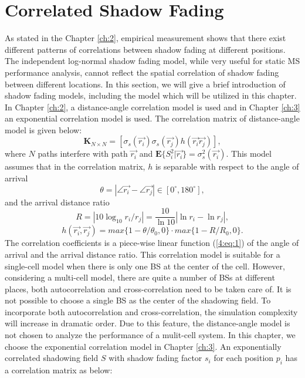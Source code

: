  \section{Correlated Shadow Fading}
 \label{4:CorrShadowField}
 As stated in the Chapter \ref{ch:2}, empirical measurement shows that there exist different patterns of correlations between shadow fading at different positions. The independent log-normal shadow fading model, while very useful for static MS performance analysis, cannot reflect the spatial correlation of shadow fading between different locations. In this section, we will give a brief introduction of shadow fading models, including the model which will be utilized in this chapter.
 In Chapter \ref{ch:2}, a distance-angle correlation model is used and in Chapter \ref{ch:3} an exponential correlation model is used. The correlation matrix of distance-angle model is given below:
 \begin{equation}
 \mathbf{K}_{N\times N} = [ \sigma_{s}(\vec{r_{i}})\sigma_{s}(\vec{r_{j}})h(\vec{r_{i}}\vec{r_{j}})],
 \label{4:correlationmatrix}
 \end{equation}
 where $N$ paths interfere with path $\vec{r_{i}}$ and $\mathbf{E}\{S_{i}^{2}|\vec{r_{i}}\}=\sigma_{s}^{2}(\vec{r_{i}})$. This model assumes that in the correlation matrix, $h$ is separable with respect to the angle of arrival
 \begin{equation}
 \theta = |\angle\vec{r_{i}}-\angle\vec{r_{j}}|\in [0^{\circ},180^{\circ}],
 \end{equation}
 and the arrival distance ratio
 \begin{equation}
 R=|10\log_{10}r_{i}/r_{j}|=\frac{10}{\ln 10}|\ln r_{i}-\ln r_{j}|,
 \end{equation}
 \begin{equation}
 h(\vec{r_{i}},\vec{r_{j}})=max\{1-\theta/\theta_{0},0\}\cdot max\{1-R/R_{0},0\}.
 \label{4:eq:1}
 \end{equation}
 The correlation coefficients is a piece-wise linear function (\ref{4:eq:1}) of the angle of arrival and the arrival distance ratio. This correlation model is suitable for a single-cell model when there is only one BS at the center of the cell. However, considering a multi-cell model, there are quite a number of BSs at different places, both autocorrelation and cross-correlation need to be taken care of. It is not possible to choose a single BS as the center of the shadowing field. To incorporate both autocorrelation and cross-correlation, the simulation complexity will increase in dramatic order. Due to this feature, the distance-angle model is not chosen to analyze the performance of a mulit-cell system. In this chapter, we choose the exponential correlation model in Chapter \ref{ch:3}. An exponentially correlated shadowing field $S$ with shadow fading factor $s_{i}$ for each position $p_{i}$ has a correlation matrix as below:
